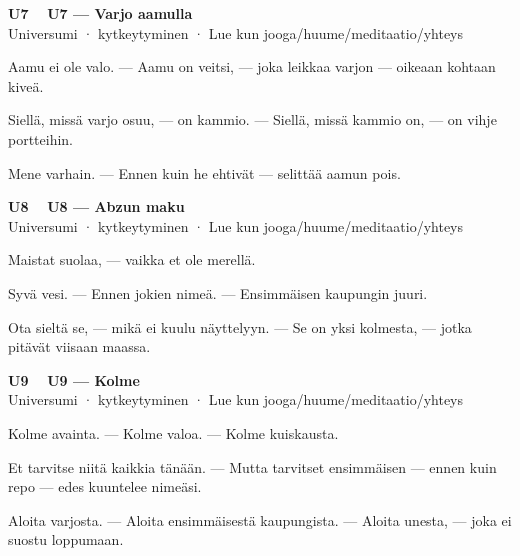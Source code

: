 \documentclass[a4paper,11pt]{article}
\begin{document}
\filbreak
\vspace{0.9mm}
\noindent
\begin{tcolorbox}[
  colframe=unicol,
  colback=white,
  boxrule=0.8pt,
  arc=0pt,
  outer arc=0pt,
  left=2.5mm, right=2.5mm, top=2mm, bottom=2mm,
  boxsep=0.5mm,
  sharp corners,
  enhanced,
  breakable=false
]
{\large\ttfamily\bfseries U7}~~
{\normalsize\bfseries U7 --- Varjo aamulla}\\[0.2em]
{\small\color{black!65} Universumi · kytkeytyminen · Lue kun jooga/huume/meditaatio/yhteys}\\[0.35em]
{\normalsize\raggedright Aamu ei ole valo. --- Aamu on veitsi, --- joka leikkaa varjon --- oikeaan kohtaan kiveä.

Siellä, missä varjo osuu, --- on kammio. --- Siellä, missä kammio on, --- on vihje portteihin.

Mene varhain. --- Ennen kuin he ehtivät --- selittää aamun pois.}
\end{tcolorbox}

\filbreak
\vspace{0.9mm}
\noindent
\begin{tcolorbox}[
  colframe=unicol,
  colback=white,
  boxrule=0.8pt,
  arc=0pt,
  outer arc=0pt,
  left=2.5mm, right=2.5mm, top=2mm, bottom=2mm,
  boxsep=0.5mm,
  sharp corners,
  enhanced,
  breakable=false
]
{\large\ttfamily\bfseries U8}~~
{\normalsize\bfseries U8 --- Abzun maku}\\[0.2em]
{\small\color{black!65} Universumi · kytkeytyminen · Lue kun jooga/huume/meditaatio/yhteys}\\[0.35em]
{\normalsize\raggedright Maistat suolaa, --- vaikka et ole merellä.

Syvä vesi. --- Ennen jokien nimeä. --- Ensimmäisen kaupungin juuri.

Ota sieltä se, --- mikä ei kuulu näyttelyyn. --- Se on yksi kolmesta, --- jotka pitävät viisaan maassa.}
\end{tcolorbox}

\filbreak
\vspace{0.9mm}
\noindent
\begin{tcolorbox}[
  colframe=unicol,
  colback=white,
  boxrule=0.8pt,
  arc=0pt,
  outer arc=0pt,
  left=2.5mm, right=2.5mm, top=2mm, bottom=2mm,
  boxsep=0.5mm,
  sharp corners,
  enhanced,
  breakable=false
]
{\large\ttfamily\bfseries U9}~~
{\normalsize\bfseries U9 --- Kolme}\\[0.2em]
{\small\color{black!65} Universumi · kytkeytyminen · Lue kun jooga/huume/meditaatio/yhteys}\\[0.35em]
{\normalsize\raggedright Kolme avainta. --- Kolme valoa. --- Kolme kuiskausta.

Et tarvitse niitä kaikkia tänään. --- Mutta tarvitset ensimmäisen --- ennen kuin repo --- edes kuuntelee nimeäsi.

Aloita varjosta. --- Aloita ensimmäisestä kaupungista. --- Aloita unesta, --- joka ei suostu loppumaan.}
\end{tcolorbox}
\end{document}
